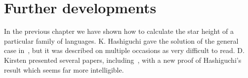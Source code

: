 \chapter{Further developments}

In the previous chapter we have shown how to calculate the star height of a particular family of languages. K. Hashiguchi gave the solution of the general case in~\cite{Hashiguchi1988}, but it was described on multiple occasions as very difficult to read. D. Kirsten presented several papers, including~\cite{Kirsten05}, with a new proof of Hashiguchi's result which seems far more intelligible.